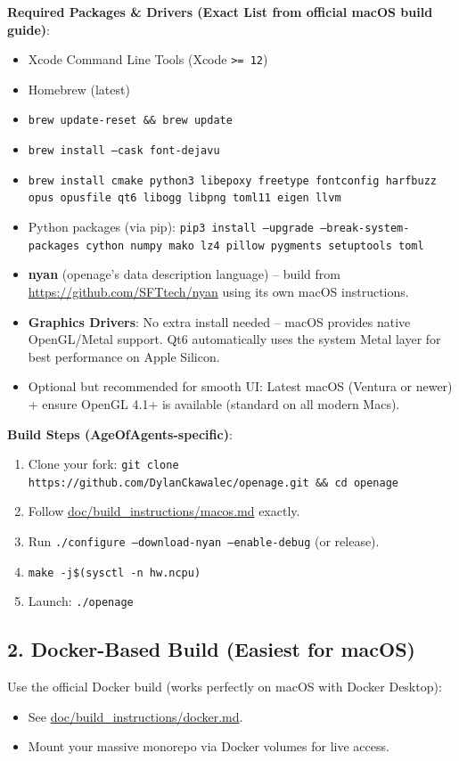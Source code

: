 \documentclass[11pt,a4paper]{article}
\begin{document}
\textbf{Required Packages \& Drivers (Exact List from official macOS build guide)}:
\begin{itemize}
    \item Xcode Command Line Tools (Xcode \texttt{>= 12})
    \item Homebrew (latest)
    \item \texttt{brew update-reset \&\& brew update}
    \item \texttt{brew install --cask font-dejavu}
    \item \texttt{brew install cmake python3 libepoxy freetype fontconfig harfbuzz opus opusfile qt6 libogg libpng toml11 eigen llvm}
    \item Python packages (via pip):
      \texttt{pip3 install --upgrade --break-system-packages cython numpy mako lz4 pillow pygments setuptools toml}
    \item \textbf{nyan} (openage’s data description language) – build from \href{https://github.com/SFTtech/nyan}{https://github.com/SFTtech/nyan} using its own macOS instructions.
    \item \textbf{Graphics Drivers}: No extra install needed – macOS provides native OpenGL/Metal support. Qt6 automatically uses the system Metal layer for best performance on Apple Silicon.
    \item Optional but recommended for smooth UI: Latest macOS (Ventura or newer) + ensure OpenGL 4.1+ is available (standard on all modern Macs).
\end{itemize}

\textbf{Build Steps (AgeOfAgents-specific)}:
\begin{enumerate}
    \item Clone your fork: \texttt{git clone https://github.com/DylanCkawalec/openage.git \&\& cd openage}
    \item Follow \href{https://github.com/DylanCkawalec/openage/blob/master/doc/build_instructions/macos.md}{doc/build\_instructions/macos.md} exactly.
    \item Run \texttt{./configure --download-nyan --enable-debug} (or release).
    \item \texttt{make -j\$(sysctl -n hw.ncpu)}
    \item Launch: \texttt{./openage}
\end{enumerate}

\subsection{2. Docker-Based Build (Easiest for macOS)}
Use the official Docker build (works perfectly on macOS with Docker Desktop):
\begin{itemize}
    \item See \href{https://github.com/DylanCkawalec/openage/blob/master/doc/build_instructions/docker.md}{doc/build\_instructions/docker.md}.
    \item Mount your massive monorepo via Docker volumes for live access.
\end{itemize}
\end{document}
